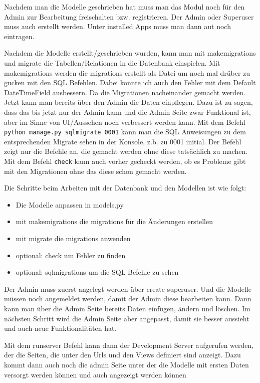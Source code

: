 \documentclass[11pt,a4paper]{report}
\begin{document}
Nachdem man die Modelle geschrieben hat muss man das Modul noch für den Admin zur Bearbeitung freischalten bzw. registrieren. Der Admin oder Superuser muss auch erstellt werden. Unter installed Apps muss man dann aut noch eintragen.


Nachdem die Modelle erstellt/geschrieben wurden, kann man mit makemigrations und migrate die Tabellen/Relationen in die Datenbank einspielen. Mit makemigrations werden die migrations erstellt als Datei um noch mal drüber zu gucken mit den SQL Befehlen. Dabei konnte ich auch den Fehler mit dem Default DateTimeField ausbessern. Da die Migrationen nacheinander gemacht werden. Jetzt kann man bereits über den Admin die Daten einpflegen. Dazu ist zu sagen, dass das bis jetzt nur der Admin kann und die Admin Seite zwar Funktional ist, aber im Sinne von UI/Aussehen noch verbessert werden kann. Mit dem Befehl \verb|python manage.py sqlmigrate 0001| kann man die SQL Anweisungen zu dem entsprechenden Migrate sehen in der Konsole, z.b. zu 0001 initial. Der Befehl zeigt nur die Befehle an, die gemacht werden ohne diese tatsächlich zu machen.
Mit dem Befehl \verb|check| kann auch vorher gecheckt werden, ob es Probleme gibt mit den Migrationen ohne das diese schon gemacht werden.


Die Schritte beim Arbeiten mit der Datenbank und den Modellen ist wie folgt:
\begin{itemize}
\item Die Modelle anpassen in models.py
\item mit makemigrations die migrations für die Änderungen erstellen
\item mit migrate die migrations anwenden
\item optional: check um Fehler zu finden
\item optional: sqlmigrations um die SQL Befehle zu sehen
\end{itemize}


Der Admin muss zuerst angelegt werden über create superuser.
Und die Modelle müssen noch angemeldet werden, damit der Admin diese bearbeiten kann. Dann kann man über die Admin Seite bereits Daten einfügen, ändern und löschen. Im nächsten Schritt wird die Admin Seite aber angepasst, damit sie besser aussieht und auch neue Funktionalitäten hat. 

Mit dem runserver Befehl kann dann der Development Server aufgerufen werden, der die Seiten, die unter den Urls und den Views definiert sind anzeigt. Dazu kommt dann auch noch die admin Seite unter der die Modelle mit ersten Daten versorgt werden können und auch angezeigt werden können
\end{document}
